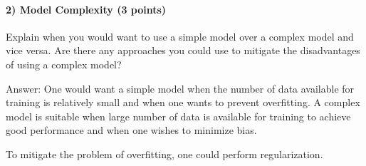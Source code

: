 \documentclass[11pt]{article}
\begin{document}
	\paragraph{2) Model Complexity (3 points)} Explain when you would want to use a simple model over a complex model and vice versa. Are there any approaches you could use to mitigate the disadvantages of using a complex model?\newline
	
	Answer: One would want a simple model when the number of data available for training is relatively small and when one wants to prevent overfitting.
A complex model is suitable when large number of data is available for training to achieve good performance and when one wishes to minimize bias.\newline
	
	To mitigate the problem of overfitting, one could perform regularization.

	
	
\end{document}
